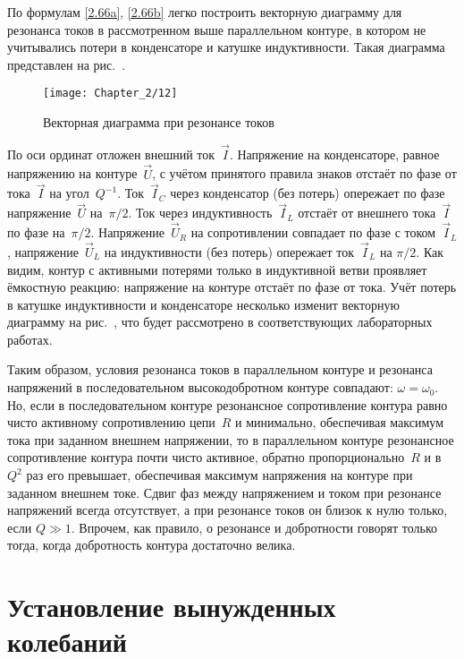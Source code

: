 По формулам \eqref{2.66a}, \eqref{2.66b} легко построить векторную диаграмму для
резонанса токов в рассмотренном выше параллельном контуре, в котором не
учитывались потери в конденсаторе и катушке индуктивности. Такая диаграмма
представлен на рис.~.

\begin{figure}[h!]
	\centering\texttt{[image: Chapter\_2/12]}
	\caption{Векторная диаграмма при резонансе токов}
\end{figure}

По оси ординат отложен внешний ток~$\vec I$. Напряжение на конденсаторе, равное
напряжению на контуре~$\vec U$, с учётом принятого правила знаков отстаёт по
фазе от тока~$\vec I$ на угол~$Q^{-1}$. Ток~$\vec I_C$ через конденсатор (без
потерь) опережает по фазе напряжение~$\vec U$ на~$\pi/2$. Ток через
индуктивность~$\vec I_L$ отстаёт от внешнего тока~$\vec I$ по фазе на~$\pi/2$.
Напряжение~$\vec U_R$ на сопротивлении совпадает по фазе с током~$\vec I_L$,
напряжение~$\vec U_L$ на индуктивности (без потерь) опережает ток~$\vec I_L$ на
$\pi/2$. Как видим, контур с активными потерями только в индуктивной ветви
проявляет ёмкостную реакцию: напряжение на контуре отстаёт по фазе от тока. Учёт
потерь в катушке индуктивности и конденсаторе несколько изменит векторную
диаграмму на рис.~, что будет рассмотрено в соответствующих
лабораторных работах.

Таким образом, условия резонанса токов в параллельном контуре и резонанса
напряжений в последовательном высокодобротном контуре совпадают:
$\omega=\omega_0$. Но, если в последовательном контуре резонансное сопротивление
контура равно чисто активному сопротивлению цепи~$R$ и минимально, обеспечивая
максимум тока при заданном внешнем напряжении, то в параллельном контуре
резонансное сопротивление контура почти чисто активное, обратно
пропорционально~$R$ и в~$Q^2$ раз его превышает, обеспечивая максимум напряжения
на контуре при заданном внешнем токе. Сдвиг фаз между напряжением и током при
резонансе напряжений всегда отсутствует, а при резонансе токов он близок к нулю
только, если $Q\gg1$. Впрочем, как правило, о резонансе и добротности говорят
только тогда, когда добротность контура достаточно велика.

\section{Установление вынужденных колебаний}

